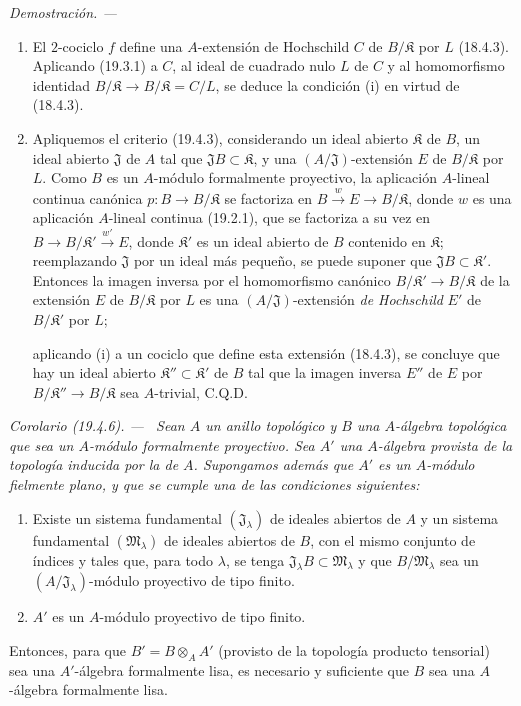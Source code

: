 \documentclass[10pt,oneside]{book}
\makeatletter
\newcommand{\setmanualcurrentlabel}[1]{\def\@currentlabel{#1}}
\newcommand{\oldpage}[2][]{%
  \setcounter{footnote}{0}%
  \marginpar{\scriptsize\textbf{#1}~|~#2}\ignorespaces}
\newenvironment{corollary}[1][]{%
  \setmanualcurrentlabel{#1}\par\medskip\noindent\itshape Corolario (#1). ---\ }{\par}
\newenvironment{proof}{%
  \par\medskip\noindent\textit{Demostración. ---\ }}{\par}
\makeatother
\begin{document}
\begin{proof}
\begin{enumerate}
  \item[(i)] El $2$-cociclo $f$ define una $A$-extensión de Hochschild $C$
  de $B/\mathfrak K$ por $L$ (18.4.3). Aplicando (19.3.1) a $C$, al ideal
  de cuadrado nulo $L$ de $C$ y al homomorfismo identidad
  $B/\mathfrak K\to B/\mathfrak K=C/L$, se deduce la condición (i) en
  virtud de (18.4.3).
  \item[(ii)] Apliquemos el criterio (19.4.3), considerando un ideal abierto
  $\mathfrak K$ de $B$, un ideal abierto $\mathfrak J$ de $A$ tal que
  $\mathfrak JB\subset\mathfrak K$, y una $(A/\mathfrak J)$-extensión $E$
  de $B/\mathfrak K$ por $L$. Como $B$ es un $A$-módulo formalmente
  proyectivo, la aplicación $A$-lineal continua canónica
  $p:B\to B/\mathfrak K$ se factoriza en
  $B\xrightarrow{w}E\to B/\mathfrak K$, donde $w$ es una aplicación
  $A$-lineal continua (19.2.1), que se factoriza a su vez en
  $B\to B/\mathfrak K'\xrightarrow{w'}E$, donde $\mathfrak K'$ es un ideal
  abierto de $B$ contenido en $\mathfrak K$; reemplazando $\mathfrak J$ por
  un ideal más pequeño, se puede suponer que
  $\mathfrak JB\subset\mathfrak K'$. Entonces la imagen inversa por
  el homomorfismo canónico $B/\mathfrak K'\to B/\mathfrak K$ de
  la extensión $E$ de $B/\mathfrak K$ por $L$ es una
  $(A/\mathfrak J)$-extensión \emph{de Hochschild} $E'$ de
  $B/\mathfrak K'$ por $L$;

  \oldpage[0\textsubscript{IV-1}]{88}

  aplicando (i) a un cociclo que define esta extensión (18.4.3), se
  concluye que hay un ideal abierto
  $\mathfrak K''\subset\mathfrak K'$ de $B$ tal que la imagen inversa
  $E''$ de $E$ por $B/\mathfrak K''\to B/\mathfrak K$ sea
  $A$-trivial, C.Q.D.
\end{enumerate}
\end{proof}

\begin{corollary}[19.4.6]
\label{0.19.4.6-es}
Sean $A$ un anillo topológico y $B$ una $A$-álgebra topológica que sea un
$A$-módulo formalmente proyectivo. Sea $A'$ una $A$-álgebra provista de
la topología inducida por la de $A$. Supongamos además que $A'$ es un
$A$-módulo fielmente plano, y que se cumple una de las condiciones
siguientes:
\begin{enumerate}
  \item[$1^\circ$] Existe un sistema fundamental
  $(\mathfrak J_\lambda)$ de ideales abiertos de $A$ y un sistema fundamental
  $(\mathfrak M_\lambda)$ de ideales abiertos de $B$, con el mismo conjunto
  de índices y tales que, para todo $\lambda$, se tenga
  $\mathfrak J_\lambda B\subset\mathfrak M_\lambda$ y que
  $B/\mathfrak M_\lambda$ sea un
  $(A/\mathfrak J_\lambda)$-módulo proyectivo de tipo finito.
  \item[$2^\circ$] $A'$ es un $A$-módulo proyectivo de tipo finito.
\end{enumerate}
Entonces, para que $B'=B\otimes_A A'$ (provisto de la topología producto tensorial)
sea una $A'$-álgebra formalmente lisa, es necesario y suficiente que $B$ sea una
$A$-álgebra formalmente lisa.
\end{corollary}
\end{document}
